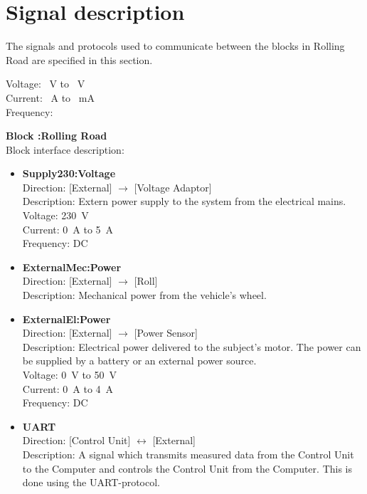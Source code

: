  \section{Signal description}
The signals and protocols used to communicate between the blocks in Rolling Road are specified in this section.


	Voltage: \SI{}{\volt} to \SI{}{\volt}\\
	Current: \SI{}{\ampere} to \SI{}{\milli \ampere}\\
	Frequency: 


\textbf{Block :Rolling Road}\\
Block interface description:
\begin{itemize}
	\item \textbf{Supply230:Voltage}\\
	Direction: [External] $\rightarrow$ [Voltage Adaptor]\\
	Description: Extern power supply to the system from the electrical mains.\\
	Voltage: \SI{230}{\volt}\\
	Current: \SI{0}{\ampere} to \SI{5}{\ampere}\\
	Frequency: DC
	\item \textbf{ExternalMec:Power}\\
	Direction: [External] $\rightarrow$ [Roll]\\
	Description: Mechanical power from the vehicle's wheel.
	\item \textbf{ExternalEl:Power}\\
	Direction: [External] $\rightarrow$ [Power Sensor]\\
	Description: Electrical power delivered to the subject's motor. The power can be supplied by a battery or an external power source.\\
	Voltage: \SI{0}{\volt} to \SI{50}{\volt}\\
	Current: \SI{0}{\ampere} to \SI{4}{\ampere}\\
	Frequency: DC
	\item \textbf{UART}\\
	Direction: [Control Unit] $\leftrightarrow$ [External]\\
	Description: A signal which transmits measured data from the Control Unit to the Computer and controls the Control Unit from the Computer. This is done using the UART-protocol.
\end{itemize}
	
